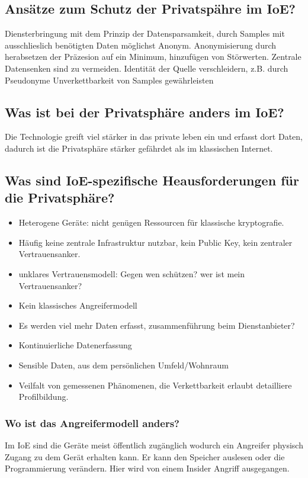 	\subsection{Ansätze zum Schutz der Privatspähre im IoE?}
	Diensterbringung mit dem Prinzip der Datensparsamkeit, durch Samples mit ausschlieslich benötigten Daten möglichst Anonym.
	Anonymisierung durch herabsetzen der Präzesion auf ein Minimum, hinzufügen von Störwerten.
	Zentrale Datensenken sind zu vermeiden. 
	Identität der Quelle verschleidern, z.B. durch Pseudonyme
	Unverkettbarkeit von Samples gewährleisten
	
	\subsection{Was ist bei der Privatsphäre anders im IoE?}
	Die Technologie greift viel stärker in das private leben ein und erfasst dort Daten, dadurch ist die Privatsphäre stärker gefährdet als im klassischen Internet.
	
	\subsection{Was sind IoE-spezifische Heausforderungen für die Privatsphäre?}
	\begin{itemize}
		\item Heterogene Geräte: nicht genügen Ressourcen für klassische kryptografie.
		\item Häufig keine zentrale Infrastruktur nutzbar, kein Public Key, kein zentraler Vertrauensanker.
		\item unklares Vertrauensmodell: Gegen wen schützen? wer ist mein Vertrauensanker?
		\item Kein klassisches Angreifermodell
		\item Es werden viel mehr Daten erfasst, zusammenführung beim Dienstanbieter?
		\item Kontinuierliche Datenerfassung
		\item Sensible Daten, aus dem persönlichen Umfeld/Wohnraum
		\item Veilfalt von gemessenen Phänomenen, die Verkettbarkeit erlaubt detailliere Profilbildung.
	\end{itemize}
	\subsubsection{Wo ist das Angreifermodell anders?}
	Im IoE sind die Geräte meist öffentlich zugänglich wodurch ein Angreifer physisch Zugang zu dem Gerät erhalten kann. Er kann den Speicher auslesen oder die Programmierung verändern.
	Hier wird von einem Insider Angriff ausgegangen.
	
